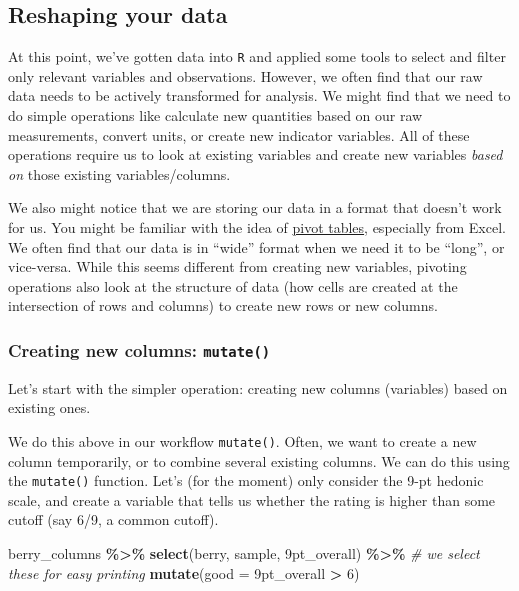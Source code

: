 \documentclass[
]{book}
\newenvironment{Shaded}{\begin{snugshade}}{\end{snugshade}}
\newcommand{\AttributeTok}[1]{\textcolor[rgb]{0.13,0.29,0.53}{#1}}
\newcommand{\CommentTok}[1]{\textcolor[rgb]{0.56,0.35,0.01}{\textit{#1}}}
\newcommand{\DecValTok}[1]{\textcolor[rgb]{0.00,0.00,0.81}{#1}}
\newcommand{\FunctionTok}[1]{\textcolor[rgb]{0.13,0.29,0.53}{\textbf{#1}}}
\newcommand{\NormalTok}[1]{#1}
\newcommand{\SpecialCharTok}[1]{\textcolor[rgb]{0.81,0.36,0.00}{\textbf{#1}}}
\newcommand{\StringTok}[1]{\textcolor[rgb]{0.31,0.60,0.02}{#1}}
\begin{document}
\hypertarget{reshaping-your-data}{%
\subsection{Reshaping your data}\label{reshaping-your-data}}

At this point, we've gotten data into \texttt{R} and applied some tools to select and filter only relevant variables and observations. However, we often find that our raw data needs to be actively transformed for analysis. We might find that we need to do simple operations like calculate new quantities based on our raw measurements, convert units, or create new indicator variables. All of these operations require us to look at existing variables and create new variables \emph{based on} those existing variables/columns.

We also might notice that we are storing our data in a format that doesn't work for us. You might be familiar with the idea of \href{https://en.wikipedia.org/wiki/Pivot_table}{pivot tables}, especially from Excel. We often find that our data is in ``wide'' format when we need it to be ``long'', or vice-versa. While this seems different from creating new variables, pivoting operations also look at the structure of data (how cells are created at the intersection of rows and columns) to create new rows or new columns.

\hypertarget{creating-new-columns-mutate}{%
\subsubsection{\texorpdfstring{Creating new columns: \texttt{mutate()}}{Creating new columns: mutate()}}\label{creating-new-columns-mutate}}

Let's start with the simpler operation: creating new columns (variables) based on existing ones.

We do this above in our workflow \texttt{mutate()}. Often, we want to create a new column temporarily, or to combine several existing columns. We can do this using the \texttt{mutate()} function. Let's (for the moment) only consider the 9-pt hedonic scale, and create a variable that tells us whether the rating is higher than some cutoff (say 6/9, a common cutoff).

\begin{Shaded}
\begin{Highlighting}[]
\NormalTok{berry\_columns }\SpecialCharTok{\%\textgreater{}\%}
  \FunctionTok{select}\NormalTok{(berry, sample, }\StringTok{\textasciigrave{}}\AttributeTok{9pt\_overall}\StringTok{\textasciigrave{}}\NormalTok{) }\SpecialCharTok{\%\textgreater{}\%}  \CommentTok{\# we select these for easy printing}
  \FunctionTok{mutate}\NormalTok{(}\AttributeTok{good =} \StringTok{\textasciigrave{}}\AttributeTok{9pt\_overall}\StringTok{\textasciigrave{}} \SpecialCharTok{\textgreater{}} \DecValTok{6}\NormalTok{)}
\end{Highlighting}
\end{Shaded}
\end{document}
